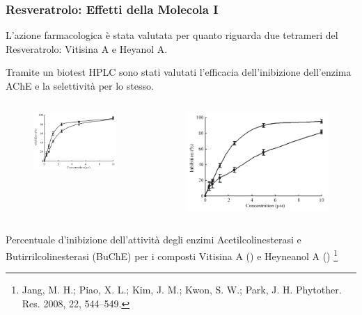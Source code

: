 \documentclass[9pt]{beamer}
\newcommand\blfootnote[1]{%
	\begingroup
	\renewcommand\thefootnote{}\footnote{#1}%
	\addtocounter{footnote}{-1}%
	\endgroup
}
\begin{document}
\begin{frame}
	\frametitle{Resveratrolo: Effetti della Molecola I}
	L'azione farmacologica è stata valutata per quanto riguarda due tetrameri del Resveratrolo: Vitisina A e Heyanol A.
	
	Tramite un biotest HPLC sono stati valutati l'efficacia dell'inibizione dell'enzima AChE e la selettività per lo stesso.
	
	\begin{columns}
		\begin{column}{0.5\textwidth}
			\begin{figure}
				\includegraphics[width=\textwidth]{immagini/risache_resveratrolo.png}
			\end{figure}
		\end{column}
		\begin{column}{0.5\textwidth}
			\begin{figure}
				\includegraphics[width=\textwidth]{immagini/risbuche_resveratrolo.png}
			\end{figure}
		\end{column}
	\end{columns}
	Percentuale d'inibizione dell'attività degli enzimi Acetilcolinesterasi e Butirrilcolinesterasi (BuChE) per i composti Vitisina A () e Heyneanol A ()
	\blfootnote{Jang, M. H.; Piao, X. L.; Kim, J. M.; Kwon, S. W.; Park, J. H.
		Phytother. Res. 2008, 22, 544–549.}
\end{frame}
\end{document}
